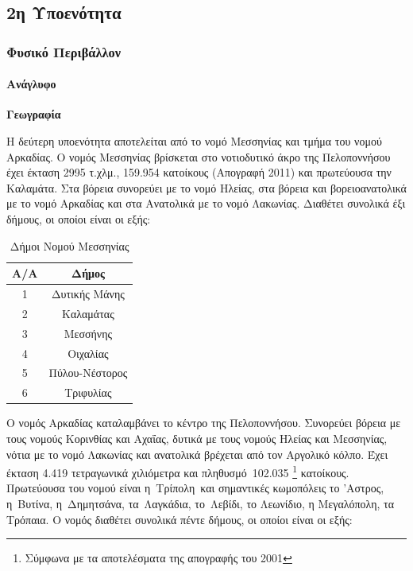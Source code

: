 \documentclass[12pt]{article}
\begin{document}
	\subsection{2η  Υποενότητα}
	
	\subsubsection{Φυσικό Περιβάλλον}
	
	\paragraph{Ανάγλυφο}
	
	\textbf{Γεωγραφία}
	
	Η δεύτερη υποενότητα αποτελείται από το νομό Μεσσηνίας και τμήμα του νομού Αρκαδίας. Ο νομός Μεσσηνίας  βρίσκεται στο νοτιοδυτικό άκρο της Πελοποννήσου έχει έκταση 2995 τ.χλμ., 159.954 κατοίκους (Απογραφή 2011) και πρωτεύουσα την Καλαμάτα. Στα βόρεια συνορεύει με  το νομό Ηλείας, στα βόρεια και βορειοανατολικά με το νομό Αρκαδίας και στα Ανατολικά με το νομό Λακωνίας. Διαθέτει συνολικά έξι δήμους, οι οποίοι είναι οι εξής:
	
	\begin{table}[H]
		\centering
		\begin{tabular}{|c|c|}
			\hline
			\textbf{Α/Α} & \textbf{Δήμος} \\ \hline
			1 & Δυτικής Μάνης \\ \hline
			2 & Καλαμάτας \\ \hline
			3 & Μεσσήνης \\ \hline
			4 & Οιχαλίας \\ \hline
			5 & Πύλου-Νέστορος \\ \hline
			6 & Τριφυλίας \\ \hline
		\end{tabular}
		\caption{Δήμοι Νομού Μεσσηνίας}
		\label{The label}
	\end{table}
	
	Ο νομός Αρκαδίας καταλαμβάνει το κέντρο της Πελοποννήσου. Συνορεύει βόρεια με τους νομούς Κορινθίας και Αχαΐας, δυτικά με τους νομούς Ηλείας και Μεσσηνίας, νότια με το νομό Λακωνίας και ανατολικά βρέχεται από τον Αργολικό κόλπο. Έχει έκταση 4.419 τετραγωνικά χιλιόμετρα και πληθυσμό 102.035 \footnote{Σύμφωνα με τα αποτελέσματα της απογραφής του 2001} κατοίκους. Πρωτεύουσα του νομού είναι η Τρίπολη και σημαντικές κωμοπόλεις το 'Αστρος, η Βυτίνα, η Δημητσάνα, τα Λαγκάδια, το Λεβίδι, το Λεωνίδιο, η Μεγαλόπολη, τα Τρόπαια. Ο νομός διαθέτει συνολικά πέντε δήμους, οι οποίοι είναι οι εξής:
	
\end{document}
